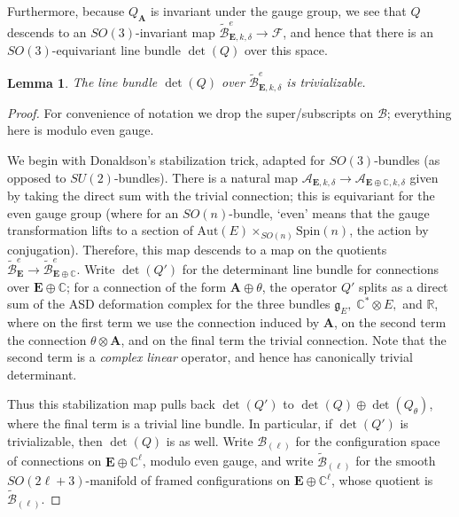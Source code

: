 \documentclass[10pt,a4paper]{amsart}
\newtheorem{lemma}[theorem]{Lemma}
\theoremstyle{definition}
\theoremstyle{remark}
\numberwithin{figure}{qchap}
\begin{document}
Furthermore, because $Q_{\mathbf{A}}$ is invariant under the gauge group, we see that $Q$ descends to an $SO(3)$-invariant map $\widetilde{\mathcal B}^e_{\mathbf{E},k,\delta} \to \mathcal F$, and hence that there is an $SO(3)$-equivariant line bundle $\det(Q)$ over this space.

\begin{lemma}\label{global-orientability}The line bundle $\det(Q)$ over $\widetilde{\mathcal B}^e_{\mathbf{E},k,\delta}$ is trivializable.
\end{lemma}
\begin{proof}For convenience of notation we drop the super/subscripts on $\mathcal B$; everything here is modulo even gauge.

We begin with Donaldson's stabilization trick, adapted for $SO(3)$-bundles (as opposed to $SU(2)$-bundles). There is a natural map $\mathcal A_{\mathbf{E},k,\delta} \to \mathcal A_{\mathbf{E} \oplus \mathbb C, k, \delta}$ given by taking the direct sum with the trivial connection; this is equivariant for the even gauge group (where for an $SO(n)$-bundle, `even' means that the gauge transformation lifts to a section of $\text{Aut}(E) \times_{SO(n)} \text{Spin}(n)$, the action by conjugation). Therefore, this map descends to a map on the quotients $\widetilde{\mathcal B}^e_{\mathbf{E}} \to \widetilde{\mathcal B}^e_{\mathbf{E} \oplus \mathbb C}.$ Write $\det(Q')$ for the determinant line bundle for connections over $\mathbf{E} \oplus \mathbb C$; for a connection of the form $\mathbf{A} \oplus \theta$, the operator $Q'$ splits as a direct sum of the ASD deformation complex for the three bundles $\mathfrak g_E, \;\mathbb C^* \otimes E,$ and  $\mathbb R$, where on the first term we use the connection induced by $\mathbf{A}$, on the second term the connection $\theta \otimes \mathbf{A}$, and on the final term the trivial connection. Note that the second term is a \emph{complex linear} operator, and hence has canonically trivial determinant.

Thus this stabilization map pulls back $\det(Q')$ to $\det(Q) \oplus \det(Q_\theta)$, where the final term is a trivial line bundle. In particular, if $\det(Q')$ is trivializable, then $\det(Q)$ is as well. Write $\mathcal B_{(\ell)}$ for the configuration space of connections on $\mathbf{E} \oplus \mathbb C^{\ell}$, modulo even gauge, and write $\widetilde{\mathcal B}_{(\ell)}$ for the smooth $SO(2\ell + 3)$-manifold of framed configurations on $\mathbf{E} \oplus \mathbb C^\ell$, whose quotient is $\widetilde{\mathcal B}_{(\ell)}$.


\end{proof}
\end{document}
